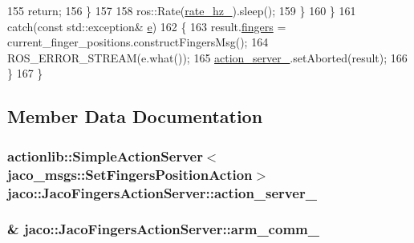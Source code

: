 \begin{DoxyCode}
155                 \textcolor{keywordflow}{return};
156             \}
157 
158             ros::Rate(\hyperlink{classjaco_1_1JacoFingersActionServer_a402a46cdd8ce3ac114cdd9f6e048f0e2}{rate\_hz\_}).sleep();
159         \}
160     \}
161     \textcolor{keywordflow}{catch}(\textcolor{keyword}{const} std::exception& \hyperlink{namespace__setup__util_acdce690b925de33d6249bbbfa1109d61}{e})
162     \{
163         result.\hyperlink{structjaco__msgs_1_1SetFingersPositionResult___a5c4ac8ab3df0087e2ea584f4b419e91a}{fingers} = current\_finger\_positions.constructFingersMsg();
164         ROS\_ERROR\_STREAM(e.what());
165         \hyperlink{classjaco_1_1JacoFingersActionServer_a34f6a67ccd8fe1ad2bc75873d20da0f1}{action\_server\_}.setAborted(result);
166     \}
167 \}
\end{DoxyCode}


\subsection{Member Data Documentation}
\subsubsection[{\texorpdfstring{action\+\_\+server\+\_\+}{action_server_}}]{\setlength{\rightskip}{0pt plus 5cm}actionlib\+::\+Simple\+Action\+Server$<${\bf jaco\+\_\+msgs\+::\+Set\+Fingers\+Position\+Action}$>$ jaco\+::\+Jaco\+Fingers\+Action\+Server\+::action\+\_\+server\+\_\+\hspace{0.3cm}{\ttfamily [private]}}\hypertarget{classjaco_1_1JacoFingersActionServer_a34f6a67ccd8fe1ad2bc75873d20da0f1}{}\label{classjaco_1_1JacoFingersActionServer_a34f6a67ccd8fe1ad2bc75873d20da0f1}
\subsubsection[{\texorpdfstring{arm\+\_\+comm\+\_\+}{arm_comm_}}]{\& jaco\+::\+Jaco\+Fingers\+Action\+Server\+::arm\+\_\+comm\+\_\+\hspace{0.3cm}{\ttfamily [private]}}\hypertarget{classjaco_1_1JacoFingersActionServer_afbddf1665a5e66b79cc79cae0b2badeb}{}\label{classjaco_1_1JacoFingersActionServer_afbddf1665a5e66b79cc79cae0b2badeb}

